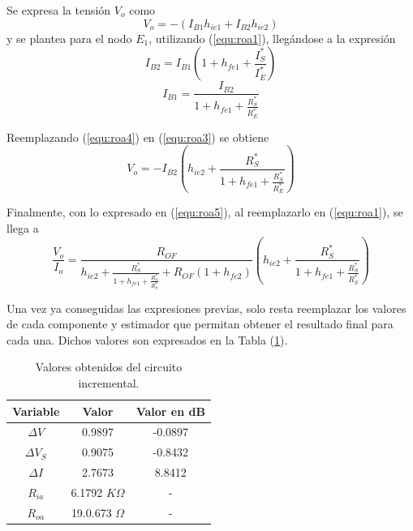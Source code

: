 Se expresa la tensión $V_o$ como
\begin{equation}
	V_o = - \left( I_{B1} h_{ie1} + I_{B2} h_{ie2} \right)
	\label{equ:roa3}
\end{equation}
y se plantea para el nodo $E_1$, utilizando (\ref{equ:roa1}), llegándose a la expresión
\begin{equation*}
	I_{B2} = I_{B1} \left( 1 +h_{fe1} + \frac{I_{S}^{*}}{I_{E}^{*}} \right)
\end{equation*}
\begin{equation}
	I_{B1} = \frac{I_{B2}}{1 +h_{fe1} + \frac{R_{S}^{*}}{R_{E}^{*}}}
	\label{equ:roa4}
\end{equation}

Reemplazando (\ref{equ:roa4}) en (\ref{equ:roa3}) se obtiene
\begin{equation}
	V_o = - I_{B2} \left( h_{ie2} + \frac{R_{S}^{*}}{ 1 +h_{fe1} + \frac{R_{S}^{*}}{R_{E}^{*}}} \right)
	\label{equ:roa5}
\end{equation}

Finalmente, con lo expresado en (\ref{equ:roa5}), al reemplazarlo en (\ref{equ:roa1}), se llega a
\begin{equation}
	\frac{V_o}{I_o} = \frac{R_{OF}}{h_{ie2} + \frac{R_{S}^{*}} {1 + h_{fe1} + \frac{R_{S}^{*}}{R_{S}^{*}}}  + R_{OF} \left( 1 + h_{fe2} \right)} \left( h_{ie2} + \frac{R_{S}^{*}} {1 + h_{fe1} + \frac{R_{S}^{*}}{R_{S}^{*}}}  \right)
	\label{equ:roa}
\end{equation}

Una vez ya conseguidas las expresiones previas, solo resta reemplazar los valores de cada componente y estimador que permitan obtener el resultado final para cada una. Dichos valores son expresados en la Tabla (\ref{tab:resultados}).

\begin{table}[H]
\centering
\begin{tabular}{ccc}
\hline
\textbf{Variable} & \textbf{Valor} & \textbf{Valor en dB} \\
\hline
$\Delta V$ & 0.9897 & -0.0897 \\
$\Delta V_S$ & 0.9075 & -0.8432 \\
$\Delta I$ & 2.7673 & 8.8412 \\
$R_{ia}$ & 6.1792 $K\Omega$ & - \\
$R_{oa}$ & 19.0.673 $\Omega$ & - \\
\hline
\end{tabular}
\caption{Valores obtenidos del circuito incremental.}
\label{tab:resultados}
\end{table}

